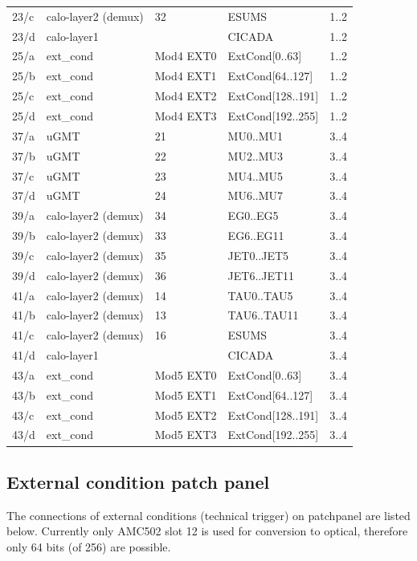 \begin{longtable}{|l|l|l|l|c|}
23/c & calo-layer2 (demux) & 32 & ESUMS & 1..2\\
23/d & calo-layer1 &  & CICADA & 1..2\\
25/a & ext\_cond & Mod4 EXT0 & ExtCond[0..63] & 1..2 \\
25/b & ext\_cond & Mod4 EXT1 & ExtCond[64..127] & 1..2\\
25/c & ext\_cond & Mod4 EXT2 & ExtCond[128..191] & 1..2\\
25/d & ext\_cond & Mod4 EXT3 & ExtCond[192..255] & 1..2\\\hline
37/a & uGMT & 21 & MU0..MU1 & 3..4\\
37/b & uGMT & 22 & MU2..MU3 & 3..4\\
37/c & uGMT & 23 & MU4..MU5 & 3..4\\
37/d & uGMT & 24 & MU6..MU7 & 3..4\\
39/a & calo-layer2 (demux) & 34 & EG0..EG5 & 3..4\\
39/b & calo-layer2 (demux) & 33 & EG6..EG11 & 3..4\\
39/c & calo-layer2 (demux) & 35 & JET0..JET5 & 3..4\\
39/d & calo-layer2 (demux) & 36 & JET6..JET11 & 3..4\\
41/a & calo-layer2 (demux) & 14 & TAU0..TAU5 & 3..4\\
41/b & calo-layer2 (demux) & 13 & TAU6..TAU11 & 3..4\\
41/c & calo-layer2 (demux) & 16 & ESUMS & 3..4\\
41/d & calo-layer1 &  & CICADA & 3..4\\
43/a & ext\_cond & Mod5 EXT0 & ExtCond[0..63] & 3..4 \\
43/b & ext\_cond & Mod5 EXT1 & ExtCond[64..127] & 3..4\\
43/c & ext\_cond & Mod5 EXT2 & ExtCond[128..191] & 3..4\\
43/d & ext\_cond & Mod5 EXT3 & ExtCond[192..255] & 3..4\\\hline
\end{longtable}

\clearpage

\subsection{External condition patch panel}\label{sec:app:ext_cond_pp}

The connections of external conditions (technical trigger) on patchpanel are listed below. Currently only AMC502 slot 12 is used for conversion to optical, therefore only 64 bits (of 256) are possible.

